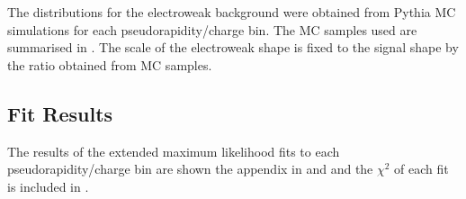 The \ETm distributions for the {electroweak} background were obtained from
Pythia MC simulations for each pseudorapidity/charge bin.  The MC samples used
are summarised in .  The scale of the {electroweak}
shape is fixed to the signal \ETm shape by the ratio obtained from MC samples.

\subsection{Fit Results}

The results of the extended maximum likelihood fits to each pseudorapidity/charge
bin are shown the appendix in  and  and
the $\chi^2$ of each fit is included in .



